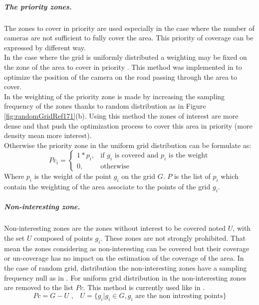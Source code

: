 \subparagraph{The priority zones.}
The zones to cover in priority are used especially in the case where the number of cameras are not sufficient to fully cover the area. This priority of coverage can be expressed by different way. \\
In the case where the grid is uniformly distributed a weighting may be fixed on the zone of the area to cover in priority \cite{141*akbarzadeh2013,84*xu2011}. This method was implemented in \citep{141*akbarzadeh2013} to optimize the position of the camera on the road passing through the area to cover. \\
In \citep{171*horster2006} the weighting of the priority zone is made by increasing the sampling frequency of the zones thanks to random distribution  as in Figure \ref{fig:randomGridRef171}(b). Using this method the zones of interest are more dense and that push the optimization process to cover this area in priority (more density mean more interest).\\
Otherwise the priority zone in the uniform grid distribution can be formulate as: 
  \begin{equation}\label{eq:PciP}
Pc_i= \begin{cases} 1*p_i, & \mbox{if } g_i\mbox{ is covered and  $p_i$ is the weight} \\ 0, & \mbox{otherwise}  \end{cases}
\end{equation}
Where $p_i$ is the weight of the point $g_i$ on the grid $G$. $P $ is the list of $p_i$ which contain the weighting of the area associate to the points of the grid $g_i$. \\

\subparagraph{Non-interesting zone.}\label{subsec:obstacleZone}
Non-interesting zones are the zones without interest to be covered noted $U$, with the set $U$ composed of points $g_i$. These zones are not strongly prohibited. That mean the zones considering as non-interesting can be covered but their coverage or un-coverage has no impact on the estimation of the coverage of the area. In the case of random grid, distribution the non-interesting zones have a sampling frequency null as in \citep{141*akbarzadeh2013}. For uniform grid distribution in the non-interesting zones are removed to the list $Pc$. This method is currently used like in \cite{22*zhao2008,170*yabuta2008,141*akbarzadeh2013,171*horster2006,84*xu2011} . 
\begin{equation}\label{eq:setU}
Pc=G-U \mbox{ ,    }  \mbox{ }U= \{ g_i | g_i \in G, g_i \mbox{ are the non intresting points} \}
\end{equation}


